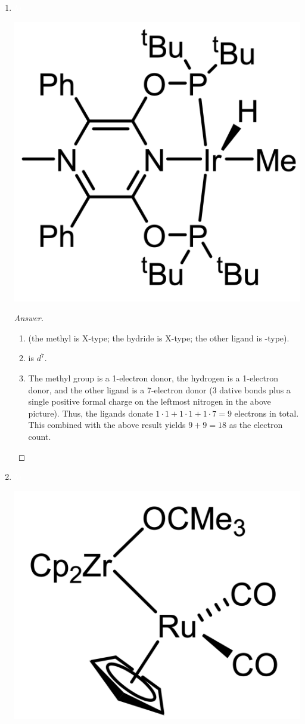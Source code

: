 \documentclass[../psets.tex]{subfiles}
\begin{document}
\begin{enumerate}
\begin{enumerate}[label={\arabic*)}]
\begin{proof}[Answer]
\begin{enumerate}[label={(\roman*)}]
                \item The phosphine is a 2-electron donor, the ether is a 2-electron donor, and the other ligand is a 3-electron donor. Thus, the ligands donate $1\cdot 2+1\cdot 2+1\cdot 3=7$ electrons in total. This combined with the above result yields $7+10-1=16$ as the electron count.
            \end{enumerate}
        \end{proof}
        \item ${\color{white}hi}$
        \begin{center}
            \includegraphics[width=0.24\linewidth]{../ExtFiles/pset1-1-17.png}
        \end{center}
        \begin{proof}[Answer]\leavevmode
            \begin{enumerate}[label={(\roman*)}]
                \item {} (the methyl is X-type; the hydride is X-type; the other ligand is -type).
                \item {} is $d^7$.
                \item The methyl group is a 1-electron donor, the hydrogen is a 1-electron donor, and the other ligand is a 7-electron donor (3 dative bonds plus a single positive formal charge on the leftmost nitrogen in the above picture). Thus, the ligands donate $1\cdot 1+1\cdot 1+1\cdot 7=9$ electrons in total. This combined with the above result yields $9+9=18$ as the electron count.
            \end{enumerate}
        \end{proof}
        \item ${\color{white}hi}$
        \begin{center}
            \includegraphics[width=0.24\linewidth]{../ExtFiles/pset1-1-18.png}
        \end{center}

\end{enumerate}
\end{enumerate}
\end{document}
